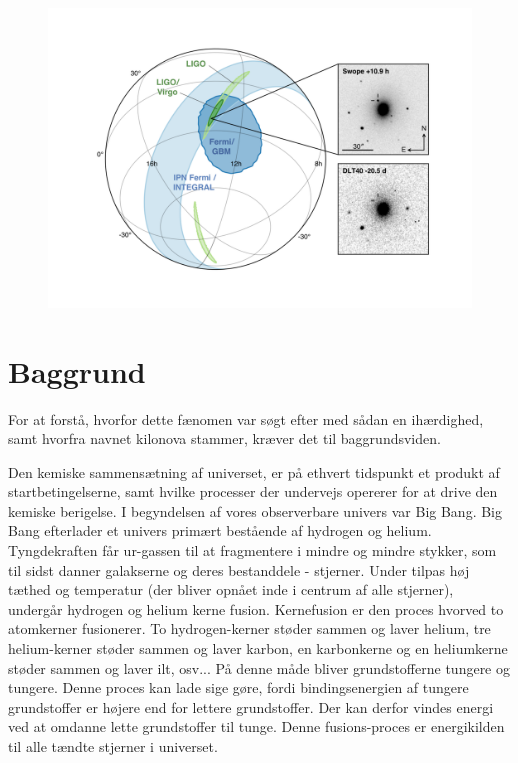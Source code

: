 \documentclass[twocolumn]{article}
\begin{document}
\begin{figure}
\includegraphics[width=\columnwidth]{GW170817_MMA_Skymap} 
\end{figure}





\section{Baggrund}\label{bag}

For at forstå, hvorfor dette fænomen var søgt efter med sådan en ihærdighed, samt hvorfra navnet kilonova stammer, kræver det til baggrundsviden. 

Den kemiske sammensætning af universet, er på ethvert tidspunkt et produkt af startbetingelserne, samt hvilke processer der undervejs opererer for at drive den kemiske berigelse. I begyndelsen af vores observerbare univers var Big Bang. Big Bang efterlader et univers primært bestående af hydrogen og helium. Tyngdekraften får ur-gassen til at fragmentere i mindre og mindre stykker, som til sidst danner galakserne og deres bestanddele - stjerner. Under tilpas høj tæthed og temperatur (der bliver opnået inde i centrum af alle stjerner), undergår hydrogen og helium kerne fusion. Kernefusion er den proces hvorved to atomkerner fusionerer. To hydrogen-kerner støder sammen og laver helium, tre helium-kerner støder sammen og laver karbon, en karbonkerne og en heliumkerne støder sammen og laver ilt, osv... På denne måde bliver grundstofferne tungere og tungere. Denne proces kan lade sige gøre, fordi bindingsenergien af tungere grundstoffer er højere end for lettere grundstoffer. Der kan derfor vindes energi ved at omdanne lette grundstoffer til tunge. Denne fusions-proces er energikilden til alle tændte stjerner i universet. 
\end{document}
